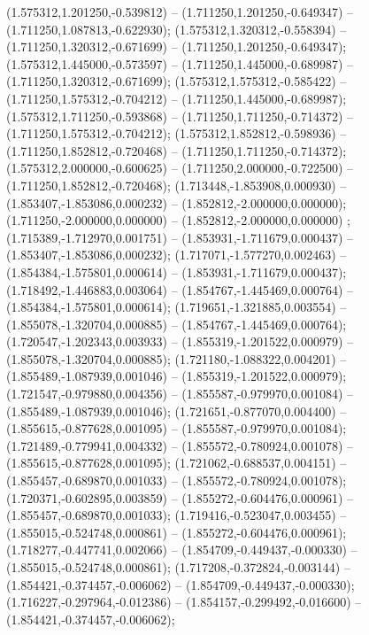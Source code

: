  (1.575312,1.201250,-0.539812) -- (1.711250,1.201250,-0.649347) -- (1.711250,1.087813,-0.622930);
 (1.575312,1.320312,-0.558394) -- (1.711250,1.320312,-0.671699) -- (1.711250,1.201250,-0.649347);
 (1.575312,1.445000,-0.573597) -- (1.711250,1.445000,-0.689987) -- (1.711250,1.320312,-0.671699);
 (1.575312,1.575312,-0.585422) -- (1.711250,1.575312,-0.704212) -- (1.711250,1.445000,-0.689987);
 (1.575312,1.711250,-0.593868) -- (1.711250,1.711250,-0.714372) -- (1.711250,1.575312,-0.704212);
 (1.575312,1.852812,-0.598936) -- (1.711250,1.852812,-0.720468) -- (1.711250,1.711250,-0.714372);
 (1.575312,2.000000,-0.600625) -- (1.711250,2.000000,-0.722500) -- (1.711250,1.852812,-0.720468);
 (1.713448,-1.853908,0.000930) -- (1.853407,-1.853086,0.000232) -- (1.852812,-2.000000,0.000000);
 (1.711250,-2.000000,0.000000) -- (1.852812,-2.000000,0.000000) ;
 (1.715389,-1.712970,0.001751) -- (1.853931,-1.711679,0.000437) -- (1.853407,-1.853086,0.000232);
 (1.717071,-1.577270,0.002463) -- (1.854384,-1.575801,0.000614) -- (1.853931,-1.711679,0.000437);
 (1.718492,-1.446883,0.003064) -- (1.854767,-1.445469,0.000764) -- (1.854384,-1.575801,0.000614);
 (1.719651,-1.321885,0.003554) -- (1.855078,-1.320704,0.000885) -- (1.854767,-1.445469,0.000764);
 (1.720547,-1.202343,0.003933) -- (1.855319,-1.201522,0.000979) -- (1.855078,-1.320704,0.000885);
 (1.721180,-1.088322,0.004201) -- (1.855489,-1.087939,0.001046) -- (1.855319,-1.201522,0.000979);
 (1.721547,-0.979880,0.004356) -- (1.855587,-0.979970,0.001084) -- (1.855489,-1.087939,0.001046);
 (1.721651,-0.877070,0.004400) -- (1.855615,-0.877628,0.001095) -- (1.855587,-0.979970,0.001084);
 (1.721489,-0.779941,0.004332) -- (1.855572,-0.780924,0.001078) -- (1.855615,-0.877628,0.001095);
 (1.721062,-0.688537,0.004151) -- (1.855457,-0.689870,0.001033) -- (1.855572,-0.780924,0.001078);
 (1.720371,-0.602895,0.003859) -- (1.855272,-0.604476,0.000961) -- (1.855457,-0.689870,0.001033);
 (1.719416,-0.523047,0.003455) -- (1.855015,-0.524748,0.000861) -- (1.855272,-0.604476,0.000961);
 (1.718277,-0.447741,0.002066) -- (1.854709,-0.449437,-0.000330) -- (1.855015,-0.524748,0.000861);
 (1.717208,-0.372824,-0.003144) -- (1.854421,-0.374457,-0.006062) -- (1.854709,-0.449437,-0.000330);
 (1.716227,-0.297964,-0.012386) -- (1.854157,-0.299492,-0.016600) -- (1.854421,-0.374457,-0.006062);
